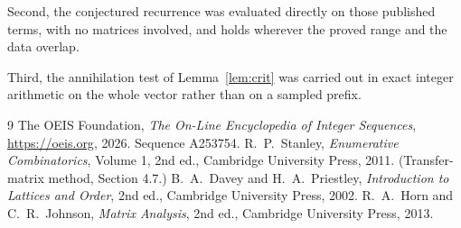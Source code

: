 \documentclass[11pt,a4paper]{article}
\theoremstyle{plain}
\theoremstyle{definition}
\begin{document}
Second, the conjectured recurrence was evaluated directly on those published terms, with no
matrices involved, and holds wherever the proved range and the data overlap.

Third, the annihilation test of Lemma~\ref{lem:crit} was carried out in exact integer
arithmetic on the whole vector rather than on a sampled prefix.

\begin{thebibliography}{9}
 The OEIS Foundation, \emph{The On-Line Encyclopedia of Integer
Sequences}, \url{https://oeis.org}, 2026. Sequence A253754.
 R.~P.~Stanley, \emph{Enumerative Combinatorics}, Volume 1, 2nd ed.,
Cambridge University Press, 2011. (Transfer-matrix method, Section 4.7.)
 B.~A.~Davey and H.~A.~Priestley, \emph{Introduction to Lattices and
Order}, 2nd ed., Cambridge University Press, 2002.
 R.~A.~Horn and C.~R.~Johnson, \emph{Matrix Analysis}, 2nd ed., Cambridge
University Press, 2013.
\end{thebibliography}
\end{document}
